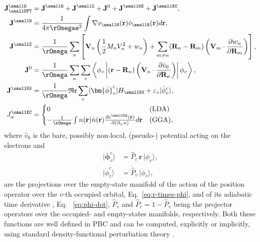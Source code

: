 \begin{align}
  \allowdisplaybreaks
  \mathbf{J}^\smallE_{\smallDFT} &=\mathbf{J}^{\smallH} + \mathbf{J}^{\smallZ} + \mathbf{J}^{0} + \mathbf{J}^{\smallKS} +  \mathbf{J}^{\smallXC}, \\
  \mathbf{J}^{\smallH} &=
  \frac{1}{4\pi \rOmega \mathtt{e}^2}\int \nabla v_{\smallH}(\mathbf r) \dot v_{\smallH}(\mathbf  r) d\mathbf{r}, \\
  \mathbf{J}^{\smallZ} \label{eq:DFT-ionic} &=
  \frac{1}{\rOmega} \sum_{n}  \left[\mathbf{V}_{n}\left(\frac{1}{2}M_{n}V_{n}^{2} + w_{n}\right) + \sum_{m\ne n}(\mathbf{R}_{n} - \mathbf{R}_{m}) \left(\mathbf{V}_{m} \cdot \frac {\partial w_{n}}{\partial \mathbf{R}_{m}} \right) \right], \\
  \mathbf{J}^{0}  &=
  \frac{1}{\rOmega}  \sum_{n} \sum_{v}\left\langle \phi_{v} \left|(\mathbf{r}-\mathbf{R}_{n})\left(\mathbf{V}_{n}\cdot\frac{\partial\hat{v}_{0}}{\partial\mathbf{R}_{n}}\right)\right| \phi_{v}\right\rangle, \\
  \mathbf{J}^{\smallKS} &= \label{eq:DFT-KS}
  \frac{1}{\rOmega}  \mathfrak{Re} \sum_{v} \langle \bm{\bar \phi}_v^c | H_{\smallKS}+\varepsilon_v | \dot \phi_v^c \rangle, \\
  J_\alpha^{\smallXC} &=
  \begin{cases}
    0 & \mathrm{(LDA)} \\
      -\frac{1}{\rOmega} \int n(\mathbf{r}) \dot{n}(\mathbf{r}) \frac{\partial\epsilon^{\smallGGA} (\mathbf{r})}{\partial(\partial_\alpha n)} d\mathbf{r} & \mathrm{(GGA)},
  \end{cases}
\end{align}
where  $\hat v_0$ is the bare, possibly non-local, (pseudo-) potential acting on the electrons and
\begin{align}
  |\bm{\bar \phi}_v^c\rangle &= \hat P_c \,\mathbf{r}  \,|\phi_v \rangle, \label{eq:r-times-phi} \\
  |\dot \phi_v^c\rangle &= \dot{\hat P}_v \,|\phi_v\rangle, \label{eq:phi-dot}
\end{align}
are the projections over the empty-state manifold of the action of the position operator over the $v$-th occupied orbital, Eq.~\eqref{eq:r-times-phi}, and of its adiabatic time derivative \citep{Giannozzi2017}, Eq.~ \eqref{eq:phi-dot}, $\hat P_v$ and $\hat P_c = 1 - \hat P_v$ being the projector operators over the occupied- and empty-states manifolds, respectively. Both these functions are well defined in PBC and can be computed, explicitly or implicitly, using standard density-functional perturbation theory \citep{Baroni2001}.



